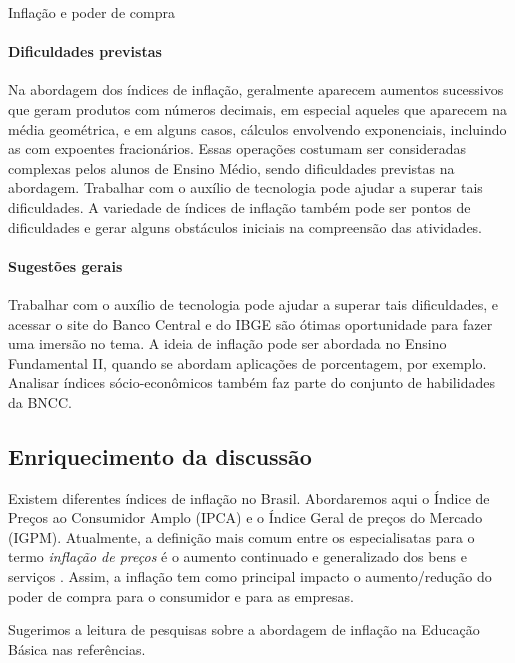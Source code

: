 \begin{paginatexto}{Inflação e poder de compra}
\paragraph{Dificuldades previstas} Na abordagem dos índices de inflação, geralmente aparecem aumentos sucessivos que geram produtos com números decimais, em especial aqueles que aparecem na média geométrica, e em alguns casos, cálculos envolvendo exponenciais, incluindo as com expoentes fracionários. Essas operações costumam ser consideradas complexas pelos alunos de Ensino Médio, sendo dificuldades previstas na abordagem. Trabalhar com o auxílio de tecnologia pode ajudar a superar tais dificuldades. A variedade de índices de inflação também pode ser pontos de dificuldades e gerar alguns obstáculos iniciais na compreensão das atividades.

\paragraph{Sugestões gerais} Trabalhar com o auxílio de tecnologia pode ajudar a superar tais dificuldades, e acessar o site do Banco Central e do IBGE são ótimas oportunidade para fazer uma imersão no tema. A ideia de inflação pode ser abordada no Ensino Fundamental II, quando se abordam aplicações de porcentagem, por exemplo. Analisar índices sócio-econômicos também faz parte do conjunto de habilidades da BNCC.

\subsection*{Enriquecimento da discussão}

Existem diferentes índices de inflação no Brasil. Abordaremos aqui o Índice de Preços ao Consumidor Amplo (IPCA) e o Índice Geral de preços do Mercado (IGPM). Atualmente, a definição mais comum entre os especialisatas para o termo \textit{inflação de preços} é o aumento continuado e generalizado dos bens e serviços \citep{ecb2017}. Assim, a inflação tem como principal impacto o aumento/redução do poder de compra para o consumidor e para as empresas.

Sugerimos a leitura de pesquisas sobre a abordagem de inflação na Educação Básica nas referências.
\end{paginatexto}


